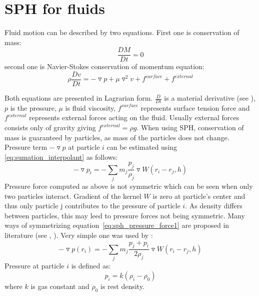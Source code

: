 \section{SPH for fluids}
Fluid motion can be described by two equations. First one is conservation of mass:
\begin{equation}
\label{eq:mass_conservation}
\frac{DM}{Dt} = 0
\end{equation}
second one is Navier-Stokes conservation of momentum equation:
\begin{equation}
\label{eq:momentum_conservation}
\rho \frac{Dv}{Dt} = -\triangledown p + \mu \triangledown^2v + f^{surface} +  f^{external}
\end{equation}

Both equations are presented in Lagrarian form. $\frac{D}{Dt}$ is a material derivative (see \cite[section 2.2]{Hauke2008}), $p$ is the pressure, $\mu$ is fluid viscosity, $f^{surface}$ represents surface tension force and $f^{external}$ represents external forces acting on the fluid. Usually external forces consists only of gravity giving $f^{external} = \rho g$.
When using SPH, conservation of mass is guaranteed by particles, as mass of the particles does not change. 
Pressure term $-\triangledown p$  at particle $i$ can be estimated using \ref{eq:sumation_interpolant} as follows:
\begin{equation}
\label{eq:sph_pressure_force1}
-\triangledown p_i = -\sum_{j}m_j \frac{p_j}{\rho_j}\triangledown W(r_i - r_j, h) 
\end{equation}
Pressure force computed as above is not symmetric which can be seen when only two particles interact. Gradient of the kernel $W$ is zero at particle's center and thus only particle j contributes to the pressure of particle $i$. As density differs between particles, this may leed to pressure forces not being symmetric. Many ways of symmetrizing equation~\ref{eq:sph_pressure_force1} are proposed in literature (see \cite[section 3.1]{Monaghan1992}, \cite[section 4.3.2]{Liu}). Very simple one was used by \cite{Muller2003}:
\begin{equation}
\label{eq:sph_pressure_force_muller}
-\triangledown p(r_i) = -\sum_{j}m_j \frac{p_j + p_i}{2\rho_j}\triangledown W(r_i - r_j, h) 
\end{equation}
Pressure at particle $i$ is defined as:
\begin{equation}
\label{eq:pressure}
p_i = k(\rho_i - \rho_0)
\end{equation}
where $k$ is gas constant and $\rho_0$ is rest density.

